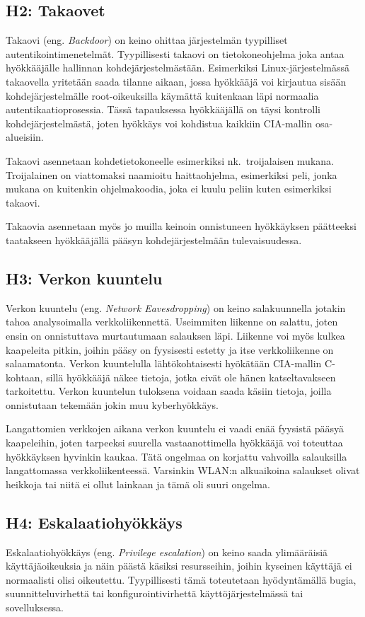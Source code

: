\subsection{H2: Takaovet}
Takaovi (eng. \textit{Backdoor}) on keino ohittaa järjestelmän tyypilliset autentikointimenetelmät. Tyypillisesti takaovi on tietokoneohjelma joka antaa hyökkääjälle hallinnan kohdejärjestelmästään. Esimerkiksi Linux-järjestelmässä takaovella yritetään saada tilanne aikaan, jossa hyökkääjä voi kirjautua sisään kohdejärjestelmälle root-oikeuksilla käymättä kuitenkaan läpi normaalia autentikaatioprosessia. Tässä tapauksessa hyökkääjällä on täysi kontrolli kohdejärjestelmästä, joten hyökkäys voi kohdistua kaikkiin CIA-mallin osa-alueisiin.

Takaovi asennetaan kohdetietokoneelle esimerkiksi nk.\ troijalaisen mukana. Troijalainen on viattomaksi naamioitu haittaohjelma, esimerkiksi peli, jonka mukana on kuitenkin ohjelmakoodia, joka ei kuulu peliin kuten esimerkiksi takaovi.

Takaovia asennetaan myös jo muilla keinoin onnistuneen hyökkäyksen päätteeksi taatakseen hyökkääjällä pääsyn kohdejärjestelmään tulevaisuudessa.~\cite{tipton2007information}

\subsection{H3: Verkon kuuntelu}
Verkon kuuntelu (eng. \textit{Network Eavesdropping}) on keino salakuunnella jotakin tahoa analysoimalla verkkoliikennettä. Useimmiten liikenne on salattu, joten ensin on onnistuttava murtautumaan salauksen läpi. Liikenne voi myös kulkea kaapeleita pitkin, joihin pääsy on fyysisesti estetty ja itse verkkoliikenne on salaamatonta. Verkon kuuntelulla lähtökohtaisesti hyökätään CIA-mallin C-kohtaan, sillä hyökkääjä näkee tietoja, jotka eivät ole hänen katseltavakseen tarkoitettu. Verkon kuuntelun tuloksena voidaan saada käsiin tietoja, joilla onnistutaan tekemään jokin muu kyberhyökkäys.

Langattomien verkkojen aikana verkon kuuntelu ei vaadi enää fyysistä pääsyä kaapeleihin, joten tarpeeksi suurella vastaanottimella hyökkääjä voi toteuttaa hyökkäyksen hyvinkin kaukaa. Tätä ongelmaa on korjattu vahvoilla salauksilla langattomassa verkkoliikenteessä. Varsinkin WLAN:n alkuaikoina salaukset olivat heikkoja tai niitä ei ollut lainkaan ja tämä oli suuri ongelma.~\cite{andress2014basics}

\subsection{H4: Eskalaatiohyökkäys}
Eskalaatiohyökkäys (eng. \textit{Privilege escalation}) on keino saada ylimääräisiä käyttäjäoikeuksia ja näin päästä käsiksi resursseihin, joihin kyseinen käyttäjä ei normaalisti olisi oikeutettu. Tyypillisesti tämä toteutetaan hyödyntämällä bugia, suunnitteluvirhettä tai konfigurointivirhettä käyttöjärjestelmässä tai sovelluksessa.

